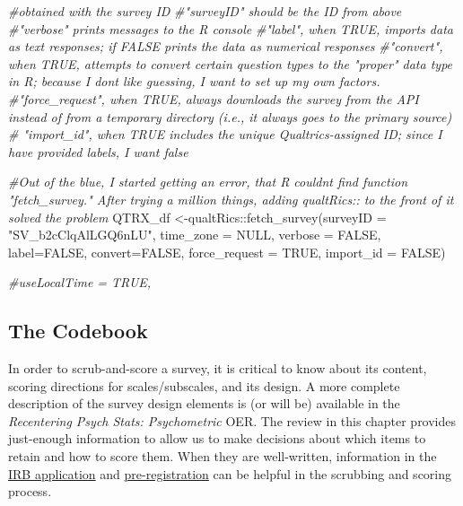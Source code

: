 \documentclass[
  english,
]{book}
\newenvironment{Shaded}{\begin{snugshade}}{\end{snugshade}}
\newcommand{\AttributeTok}[1]{\textcolor[rgb]{0.77,0.63,0.00}{#1}}
\newcommand{\CommentTok}[1]{\textcolor[rgb]{0.56,0.35,0.01}{\textit{#1}}}
\newcommand{\ConstantTok}[1]{\textcolor[rgb]{0.00,0.00,0.00}{#1}}
\newcommand{\FunctionTok}[1]{\textcolor[rgb]{0.00,0.00,0.00}{#1}}
\newcommand{\NormalTok}[1]{#1}
\newcommand{\OtherTok}[1]{\textcolor[rgb]{0.56,0.35,0.01}{#1}}
\newcommand{\SpecialCharTok}[1]{\textcolor[rgb]{0.00,0.00,0.00}{#1}}
\newcommand{\StringTok}[1]{\textcolor[rgb]{0.31,0.60,0.02}{#1}}
\begin{document}
\begin{Shaded}
\begin{Highlighting}[]
\CommentTok{\#obtained with the survey ID }
\CommentTok{\#"surveyID" should be the ID from above}
\CommentTok{\#"verbose" prints messages to the R console}
\CommentTok{\#"label", when TRUE, imports data as text responses; if FALSE prints the data as numerical responses}
\CommentTok{\#"convert", when TRUE, attempts to convert certain question types to the "proper" data type in R; because I don\textquotesingle{}t like guessing, I want to set up my own factors.}
\CommentTok{\#"force\_request", when TRUE, always downloads the survey from the API instead of from a temporary directory (i.e., it always goes to the primary source)}
\CommentTok{\# "import\_id", when TRUE includes the unique Qualtrics{-}assigned ID; since I have provided labels, I want false}

\CommentTok{\#Out of the blue, I started getting an error, that R couldn\textquotesingle{}t find function "fetch\_survey."  After trying a million things, adding qualtRics:: to the front of it solved the problem}
\NormalTok{QTRX\_df }\OtherTok{\textless{}{-}}\NormalTok{qualtRics}\SpecialCharTok{::}\FunctionTok{fetch\_survey}\NormalTok{(}\AttributeTok{surveyID =} \StringTok{"SV\_b2cClqAlLGQ6nLU"}\NormalTok{, }\AttributeTok{time\_zone =} \ConstantTok{NULL}\NormalTok{, }\AttributeTok{verbose =} \ConstantTok{FALSE}\NormalTok{, }\AttributeTok{label=}\ConstantTok{FALSE}\NormalTok{, }\AttributeTok{convert=}\ConstantTok{FALSE}\NormalTok{, }\AttributeTok{force\_request =} \ConstantTok{TRUE}\NormalTok{, }\AttributeTok{import\_id =} \ConstantTok{FALSE}\NormalTok{)}

\CommentTok{\#useLocalTime = TRUE,}
\end{Highlighting}
\end{Shaded}

\hypertarget{the-codebook}{%
\subsection{The Codebook}\label{the-codebook}}

In order to scrub-and-score a survey, it is critical to know about its content, scoring directions for scales/subscales, and its design. A more complete description of the survey design elements is (or will be) available in the \emph{Recentering Psych Stats: Psychometric} OER. The review in this chapter provides just-enough information to allow us to make decisions about which items to retain and how to score them. When they are well-written, information in the \href{./Bikos_ReCenteringPsychStats_ReCupload.pdf}{IRB application} and \href{https://osf.io/a8e5u}{pre-registration} can be helpful in the scrubbing and scoring process.
\end{document}
